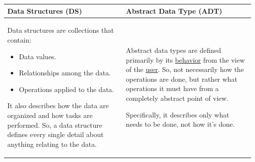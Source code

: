 \documentclass[letterpaper]{article}
\begin{document}
\begin{center}
    \begin{tabular}{|p{7cm}|p{7cm}|}
        \hline 
        \textbf{Data Structures} (DS) & \textbf{Abstract Data Type} (ADT) \\
        \hline 
        Data structures are collections that contain: 
        \begin{itemize}
            \item Data values. 
            \item Relationships among the data. 
            \item Operations applied to the data. 
        \end{itemize}
        It also describes how the data are organized and how tasks are performed. So, a data structure defines every single detail about anything relating to the data. 
        &
        Abstract data types are defined primarily by its \underline{behavior} from the view of the \underline{user}. So, not necessarily how the operations are done, but rather what operations it must have from a completely abstract point of view.  
    
        \bigskip 
    
        Specifically, it describes only what needs to be done, not how it's done. \\
        \hline 
    \end{tabular}
\end{center}
\end{document}
